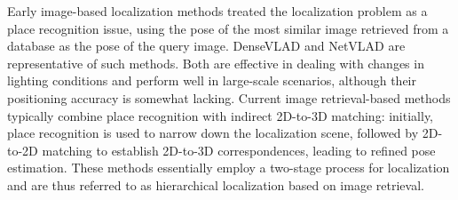 \documentclass[journal]{IEEEtran}
\begin{document}
Early image-based localization methods treated the localization problem as a place recognition issue, using the pose of the most similar image retrieved from a database as the pose of the query image. DenseVLAD\cite{densevlad} and NetVLAD\cite{ref7} are representative of such methods. Both are effective in dealing with changes in lighting conditions and perform well in large-scale scenarios, although their positioning accuracy is somewhat lacking. Current image retrieval-based methods typically combine place recognition with indirect 2D-to-3D matching: initially, place recognition is used to narrow down the localization scene, followed by 2D-to-2D matching to establish 2D-to-3D correspondences, leading to refined pose estimation. These methods essentially employ a two-stage process for localization and are thus referred to as hierarchical localization based on image retrieval\cite{ref5,ref6}.
\end{document}
